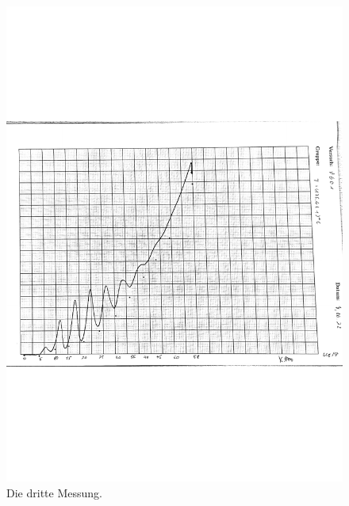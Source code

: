\begin{figure}
    \centering
    \includegraphics[width=\linewidth]{pictures/kurve3.pdf}
    \caption{Die dritte Messung.}
    \label{fig:kurve3}
\end{figure}

